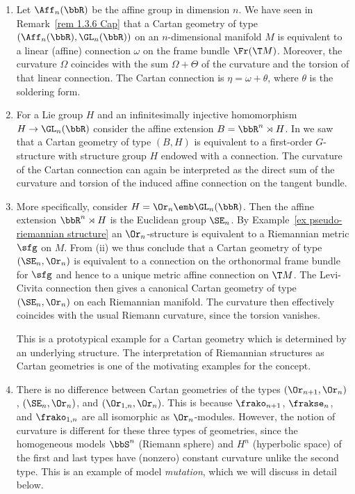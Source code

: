 \begin{example}\label{ex 1.5.1 Cap}
    \begin{enumerate}[label=(\roman*)]
        \item Let $\Aff_n(\bbR)$ be the affine group in dimension $n$. We have seen in Remark~\ref{rem 1.3.6 Cap} that a Cartan geometry of type $(\Aff_n(\bbR),\GL_n(\bbR))$ on an $n$-dimensional manifold $M$ is equivalent to a linear (affine) connection $\omega$ on the frame bundle $\Fr(\T M)$. Moreover, the curvature $\Omega$ coincides with the sum $\Omega+\Theta$ of the curvature and the torsion of that linear connection. The Cartan connection is $\eta=\omega+\theta$, where $\theta$ is the soldering form.
        \item For a Lie group $H$ and an infinitesimally injective homomorphism $H\to \GL_n(\bbR)$ consider the affine extension $B=\bbR^n\rtimes H$. In  we saw that a Cartan geometry of type $(B,H)$ is equivalent to a first-order $G$-structure with structure group $H$ endowed with a connection. The curvature of the Cartan connection can again be interpreted as the direct sum of the curvature and torsion of the induced affine connection on the tangent bundle.
        \item More specifically, consider $H=\Or_n\emb \GL_n(\bbR)$. Then the affine extension $\bbR^n\rtimes H$ is the Euclidean group $\SE_n$. By Example~\ref{ex pseudo-riemannian structure} an $\Or_n$-structure is equivalent to a Riemannian metric $\sfg$ on $M$. From (ii) we thus conclude that a Cartan geometry of type $(\SE_n,\Or_n)$ is equivalent to a connection on the orthonormal frame bundle for $\sfg$ and hence to a unique metric affine connection on $\T M$. The Levi-Civita connection then gives a canonical Cartan geometry of type $(\SE_n,\Or_n)$ on each Riemannian manifold. The curvature then effectively coincides with the usual Riemann curvature, since the torsion vanishes.
        
        This is a prototypical example for a Cartan geometry which is determined by an underlying structure. The interpretation of Riemannian structures as Cartan geometries is one of the motivating examples for the concept. 
        \item There is no difference between Cartan geometries of the types $(\Or_{n+1},\Or_n)$, $(\SE_n,\Or_n)$, and $(\Or_{1,n},\Or_n)$. This is because $\frako_{n+1}$, $\frakse_{n}$, and $\frako_{1,n}$ are all isomorphic as $\Or_n$-modules. However, the notion of curvature is different for these three types of geometries, since the homogeneous models $\bbS^n$ (Riemann sphere) and $H^n$ (hyperbolic space) of the first and last types have (nonzero) constant curvature unlike the second type. This is an example of model \emph{mutation}, which we will discuss in detail below.
    \end{enumerate}
\end{example}

